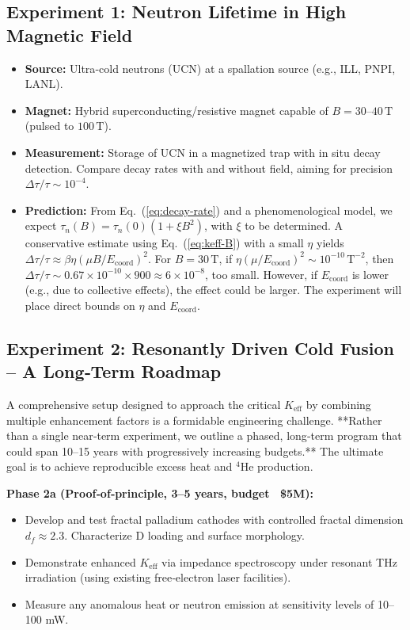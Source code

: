 \documentclass[12pt]{article}
\theoremstyle{remark}
\newcommand{\Keff}{K_{\mathrm{eff}}}
\begin{document}
	\subsection{Experiment 1: Neutron Lifetime in High Magnetic Field}
	
	\begin{itemize}
		\item \textbf{Source:} Ultra‑cold neutrons (UCN) at a spallation source (e.g., ILL, PNPI, LANL).
		\item \textbf{Magnet:} Hybrid superconducting/resistive magnet capable of \(B = 30\)–\(40\,\text{T}\) (pulsed to \(100\,\text{T}\)).
		\item \textbf{Measurement:} Storage of UCN in a magnetized trap with in situ decay detection. Compare decay rates with and without field, aiming for precision \(\Delta \tau / \tau \sim 10^{-4}\).
		\item \textbf{Prediction:} From Eq.~(\ref{eq:decay-rate}) and a phenomenological model, we expect \(\tau_n(B) = \tau_n(0) (1 + \xi B^2)\), with \(\xi\) to be determined. A conservative estimate using Eq.~(\ref{eq:keff-B}) with a small \(\eta\) yields \(\Delta \tau/\tau \approx \beta \eta (\mu B/E_{\mathrm{coord}})^2\). For \(B = 30\,\text{T}\), if \(\eta (\mu/E_{\mathrm{coord}})^2 \sim 10^{-10}\,\text{T}^{-2}\), then \(\Delta \tau/\tau \sim 0.67 \times 10^{-10} \times 900 \approx 6\times10^{-8}\), too small. However, if \(E_{\mathrm{coord}}\) is lower (e.g., due to collective effects), the effect could be larger. The experiment will place direct bounds on \(\eta\) and \(E_{\mathrm{coord}}\).
	\end{itemize}
	
	\subsection{Experiment 2: Resonantly Driven Cold Fusion – A Long‑Term Roadmap}
	
	A comprehensive setup designed to approach the critical \(\Keff\) by combining multiple enhancement factors is a formidable engineering challenge. **Rather than a single near‑term experiment, we outline a phased, long‑term program that could span 10–15 years with progressively increasing budgets.** The ultimate goal is to achieve reproducible excess heat and \(^4\)He production.
	
	\textbf{Phase 2a (Proof‑of‑principle, 3–5 years, budget ~\$5M):}
	\begin{itemize}
		\item Develop and test fractal palladium cathodes with controlled fractal dimension \(d_f \approx 2.3\). Characterize D loading and surface morphology.
		\item Demonstrate enhanced \(\Keff\) via impedance spectroscopy under resonant THz irradiation (using existing free‑electron laser facilities).
		\item Measure any anomalous heat or neutron emission at sensitivity levels of 10–100 mW.
	\end{itemize}
	
\end{document}
